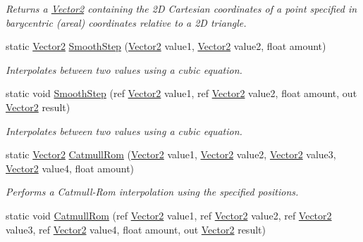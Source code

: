 \begin{DoxyCompactItemize}
\begin{DoxyCompactList}\small\item\em Returns a \hyperlink{struct_microsoft_1_1_xna_1_1_framework_1_1_vector2}{Vector2} containing the 2\+D Cartesian coordinates of a point specified in barycentric (areal) coordinates relative to a 2\+D triangle.\end{DoxyCompactList}\item 
static \hyperlink{struct_microsoft_1_1_xna_1_1_framework_1_1_vector2}{Vector2} \hyperlink{struct_microsoft_1_1_xna_1_1_framework_1_1_vector2_a7d5bcc5e9dbfab346be25615d01a3a04}{Smooth\+Step} (\hyperlink{struct_microsoft_1_1_xna_1_1_framework_1_1_vector2}{Vector2} value1, \hyperlink{struct_microsoft_1_1_xna_1_1_framework_1_1_vector2}{Vector2} value2, float amount)
\begin{DoxyCompactList}\small\item\em Interpolates between two values using a cubic equation.\end{DoxyCompactList}\item 
static void \hyperlink{struct_microsoft_1_1_xna_1_1_framework_1_1_vector2_a544da7c140a42ca0860b261b0c49a883}{Smooth\+Step} (ref \hyperlink{struct_microsoft_1_1_xna_1_1_framework_1_1_vector2}{Vector2} value1, ref \hyperlink{struct_microsoft_1_1_xna_1_1_framework_1_1_vector2}{Vector2} value2, float amount, out \hyperlink{struct_microsoft_1_1_xna_1_1_framework_1_1_vector2}{Vector2} result)
\begin{DoxyCompactList}\small\item\em Interpolates between two values using a cubic equation.\end{DoxyCompactList}\item 
static \hyperlink{struct_microsoft_1_1_xna_1_1_framework_1_1_vector2}{Vector2} \hyperlink{struct_microsoft_1_1_xna_1_1_framework_1_1_vector2_a43b1fff70ff6d31bca44616288b0866b}{Catmull\+Rom} (\hyperlink{struct_microsoft_1_1_xna_1_1_framework_1_1_vector2}{Vector2} value1, \hyperlink{struct_microsoft_1_1_xna_1_1_framework_1_1_vector2}{Vector2} value2, \hyperlink{struct_microsoft_1_1_xna_1_1_framework_1_1_vector2}{Vector2} value3, \hyperlink{struct_microsoft_1_1_xna_1_1_framework_1_1_vector2}{Vector2} value4, float amount)
\begin{DoxyCompactList}\small\item\em Performs a Catmull-\/\+Rom interpolation using the specified positions.\end{DoxyCompactList}\item 
static void \hyperlink{struct_microsoft_1_1_xna_1_1_framework_1_1_vector2_a071f330d0387d8ca73472c367cb79b38}{Catmull\+Rom} (ref \hyperlink{struct_microsoft_1_1_xna_1_1_framework_1_1_vector2}{Vector2} value1, ref \hyperlink{struct_microsoft_1_1_xna_1_1_framework_1_1_vector2}{Vector2} value2, ref \hyperlink{struct_microsoft_1_1_xna_1_1_framework_1_1_vector2}{Vector2} value3, ref \hyperlink{struct_microsoft_1_1_xna_1_1_framework_1_1_vector2}{Vector2} value4, float amount, out \hyperlink{struct_microsoft_1_1_xna_1_1_framework_1_1_vector2}{Vector2} result)

\end{DoxyCompactItemize}
